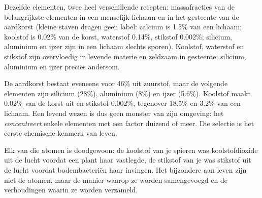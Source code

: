\begin{omfigure}

{\small Dezelfde elementen, twee heel verschillende recepten:
massafracties van de belangrijkste elementen in een menselijk lichaam
en in het gesteente van de aardkorst (kleine staven dragen geen label:
calcium is 1.5\% van een lichaam; koolstof is 0.02\% van de korst,
waterstof 0.14\%, stikstof 0.002\%; silicium, aluminium en ijzer zijn
in een lichaam slechts sporen). Koolstof, waterstof en stikstof zijn
overvloedig in levende materie en zeldzaam in gesteente; silicium,
aluminium en ijzer precies andersom.}
\end{omfigure}

\begin{example}\label{ex:g10:chemistry-of-life:crust}
De aardkorst bestaat eveneens voor 46\% uit zuurstof, maar de volgende
elementen zijn silicium (28\%), aluminium (8\%) en ijzer (5.6\%).
Koolstof maakt 0.02\% van de korst uit en stikstof 0.002\%, tegenover
18.5\% en 3.2\% van een lichaam. Een levend wezen is dus geen monster
van zijn omgeving: het \emph{concentreert} enkele elementen met een
factor duizend of meer. Die selectie is het eerste chemische kenmerk
van leven.
\end{example}

\begin{remark}\label{rem:g10:chemistry-of-life:origin}
Elk van die atomen is doodgewoon: de koolstof van je spieren was
koolstofdioxide uit de lucht voordat een plant haar vastlegde, de
stikstof van je  was stikstof uit de lucht voordat
bodembacteriën haar invingen. Het bijzondere aan leven zijn niet de
atomen, maar de manier waarop ze worden samengevoegd en de verhoudingen
waarin ze worden verzameld.
\end{remark}

